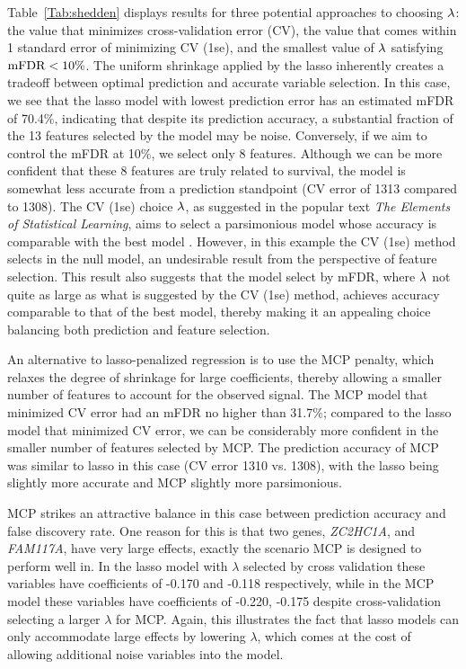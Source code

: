 Table~\ref{Tab:shedden} displays results for three potential approaches to choosing $\lambda$: the value that minimizes cross-validation error (CV), the value that comes within 1 standard error of minimizing CV (1se), and the smallest value of $\lambda$ satisfying $\textrm{mFDR} < 10\%$.  The uniform shrinkage applied by the lasso inherently creates a tradeoff between optimal prediction and accurate variable selection. In this case, we see that the lasso model with lowest prediction error has an estimated mFDR of 70.4\%, indicating that despite its prediction accuracy, a substantial fraction of the 13 features selected by the model may be noise. Conversely, if we aim to control the mFDR at 10\%, we select only 8 features.  Although we can be more confident that these 8 features are truly related to survival, the model is somewhat less accurate from a prediction standpoint (CV error of 1313 compared to 1308).  The CV (1se) choice $\lambda$, as suggested in the popular text \textit{The Elements of Statistical Learning}, aims to select a parsimonious model whose accuracy is comparable with the best model \citep{Hastie2009}. However, in this example the CV (1se) method selects in the null model, an undesirable result from the perspective of feature selection. This result also suggests that the model select by mFDR, where $\lambda$ not quite as large as what is suggested by the CV (1se) method, achieves accuracy comparable to that of the best model, thereby making it an appealing choice balancing both prediction and feature selection.


An alternative to lasso-penalized regression is to use the MCP penalty, which relaxes the degree of shrinkage for large coefficients, thereby allowing a smaller number of features to account for the observed signal.  The MCP model that minimized CV error had an mFDR no higher than 31.7\%; compared to the lasso model that minimized CV error, we can be considerably more confident in the smaller number of features selected by MCP.  The prediction accuracy of MCP was similar to lasso in this case (CV error 1310 vs. 1308), with the lasso being slightly more accurate and MCP slightly more parsimonious.

MCP strikes an attractive balance in this case between prediction accuracy and false discovery rate.  One reason for this is that two genes, \textit{ZC2HC1A}, and \textit{FAM117A}, have very large effects, exactly the scenario MCP is designed to perform well in. In the lasso model with $\lambda$ selected by cross validation these variables have coefficients of -0.170 and -0.118 respectively, while in the MCP model these variables have coefficients of -0.220, -0.175 despite cross-validation selecting a larger $\lambda$ for MCP.  Again, this illustrates the fact that lasso models can only accommodate large effects by lowering $\lambda$, which comes at the cost of allowing additional noise variables into the model.

